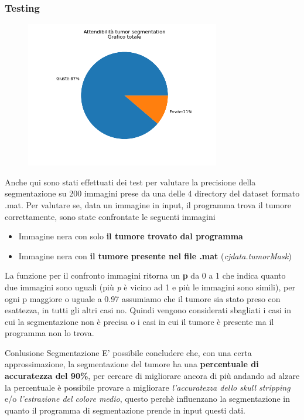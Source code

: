 \documentclass{article}
\begin{document}
\subsubsection{Testing}
\begin{figure}
    \includegraphics[width=8.5cm]{images/ts.png}
\end{figure}
Anche qui sono stati effettuati dei test per valutare la precisione della segmentazione su 200 immagini prese da una delle 4 directory 
del dataset formato .mat.
Per valutare se, data un immagine in input, il programma trova il tumore correttamente, sono state confrontate le seguenti immagini
\begin{itemize}
    \item Immagine nera con solo \textbf{il tumore trovato dal programma}
    \item Immagine nera con \textbf{il tumore presente nel file .mat} (\textit{cjdata.tumorMask})
\end{itemize}
La funzione per il confronto immagini ritorna un \textbf{p} da 0 a 1 che indica quanto due immagini sono uguali (più \textit{p} è
vicino ad 1 e più le immagini sono simili), per ogni p maggiore o uguale a 0.97 assumiamo che il tumore sia stato preso con esattezza,
in tutti gli altri casi no.
Quindi vengono considerati sbagliati i casi in cui la segmentazione non è precisa o i casi in cui il tumore è presente ma il programma non lo trova.

\hfill 

\begin{conlusione}{Conlusione Segmentazione}
    E' possibile concludere che, con una certa approssimazione, la segmentazione del tumore ha una
    \textbf{percentuale di accuratezza del 90\%}, per cercare di migliorare ancora di più andando
    ad alzare la percentuale è possibile provare a migliorare \textit{l'accuratezza dello skull stripping}
    e/o \textit{l'estrazione del colore medio}, questo perchè influenzano la segmentazione in quanto il 
    programma di segmentazione prende in input questi dati.
\end{conlusione}
\end{document}
